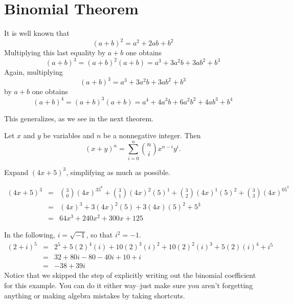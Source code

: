 \newpage

\section{Binomial Theorem}\label{chap:bino_mio}
It is well known that
\begin{equation}(a + b)^2 = a^2 + 2ab + b^2\end{equation}Multiplying this last equality by
$a + b$ one obtains
$$(a + b)^3 = (a + b)^2(a + b) = a^3 + 3a^2b + 3ab^2 + b^3$$ Again, multiplying
\begin{equation}
(a + b)^3 = a^3 + 3a^2b + 3ab^2 + b^3
\end{equation}by $a + b$ one obtains
$$(a + b)^4 = (a + b)^3(a + b) = a^4 + 4a^3b + 6a^2b^2 + 4ab^3 + b^4$$

This generalizes, as we see in the next theorem.
\begin{thm}
Let $x$ and $y$ be variables and $n$ be a nonnegative integer.  Then
$$(x+y)^n = \sum_{i=0}^{n}\binom{n}{i}x^{n-i}y^i.$$
\end{thm}

\begin{exa}
Expand $(4x + 5)^3$, simplifying as much as possible.
\begin{sol}
\begin{eqnarray*}
(4x + 5)^3 & = & \binom{3}{0}(4x)^35^0 + \binom{3}{1}(4x)^2(5)^1 + \binom{3}{2}(4x)^1(5)^2 + \binom{3}{3}(4x)^05^3 \\
& = & (4x)^3 + 3(4x)^2(5) + 3(4x)(5)^2 + 5^3 \\
& = & 64x^3 + 240x^2 + 300x + 125
\end{eqnarray*}
\end{sol}
\end{exa}

\begin{exa}
In the following, $i=\sqrt{-1}$, so that $i^2=-1$.
$$
\begin{array}{lll}
(2 + i)^5 & = & 2^5 + 5(2)^4(i) + 10(2)^3(i)^2  + 10(2)^2(i)^3 + 5(2)(i)^4 + i^5 \\
& = & 32 + 80i - 80 - 40i + 10 + i \\
& = & -38 + 39i
\end{array}
$$
Notice that we skipped the step of explicitly writing out the binomial coefficient 
for this example.  You can do it either way--just make sure you aren't forgetting anything
or making algebra mistakes by taking shortcuts.
\end{exa}

